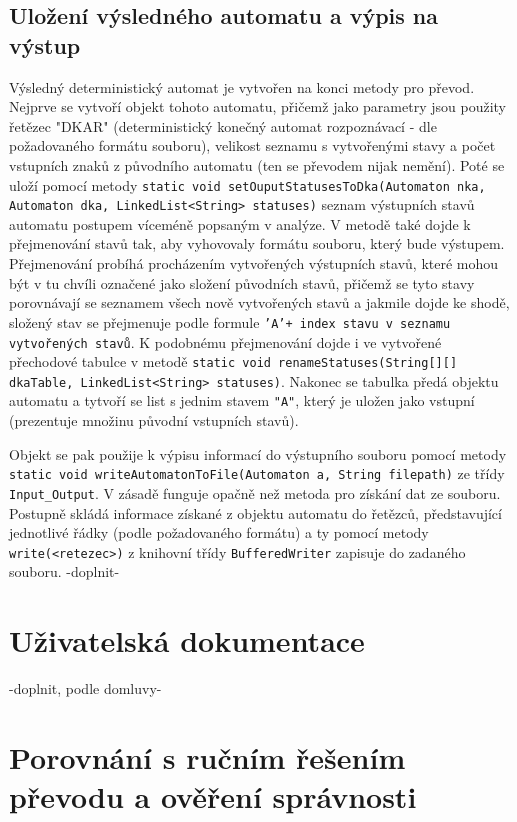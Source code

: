 \documentclass[11pt]{article}
\begin{document}
\subsection{Uložení výsledného automatu a výpis na výstup}
Výsledný deterministický automat je vytvořen na konci metody pro převod. Nejprve se vytvoří objekt tohoto automatu, přičemž jako parametry jsou použity řetězec "DKAR" (deterministický konečný automat rozpoznávací - dle požadovaného formátu souboru), velikost seznamu s vytvořenými stavy a počet vstupních znaků z původního automatu (ten se převodem nijak nemění). Poté se uloží pomocí metody \texttt{static void setOuputStatusesToDka(Automaton nka, Automaton dka, LinkedList<String> statuses)} seznam výstupních stavů automatu postupem víceméně popsaným v analýze. V metodě také dojde k přejmenování stavů tak, aby vyhovovaly formátu souboru, který bude výstupem. Přejmenování probíhá procházením vytvořených výstupních stavů, které mohou být v tu chvíli označené jako složení původních stavů, přičemž se tyto stavy porovnávají se seznamem všech nově vytvořených stavů a jakmile dojde ke shodě, složený stav se přejmenuje podle formule \texttt{'A'+ index stavu v seznamu vytvořených stavů}. K podobnému přejmenování dojde i ve vytvořené přechodové tabulce v metodě \texttt{static void renameStatuses(String[][] dkaTable, LinkedList<String> statuses)}. Nakonec se tabulka předá objektu automatu a tytvoří se list s jednim stavem \texttt{"A"}, který je uložen jako vstupní (prezentuje množinu původní vstupních stavů).

Objekt se pak použije k výpisu informací do výstupního souboru pomocí metody \texttt{static void writeAutomatonToFile(Automaton a, String filepath)} ze třídy \texttt{Input\_Output}. V zásadě funguje opačně než metoda pro získání dat ze souboru. Postupně skládá informace získané z objektu automatu do řetězců, představující jednotlivé řádky (podle požadovaného formátu) a ty pomocí metody \texttt{write(<retezec>)} z knihovní třídy \texttt{BufferedWriter} zapisuje do zadaného souboru. 
-doplnit-

\newpage

\section{Uživatelská dokumentace}

-doplnit, podle domluvy-

\newpage

\section{Porovnání s ručním řešením převodu a ověření správnosti}
\end{document}
